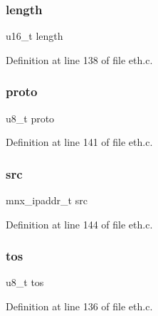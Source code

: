 \subsubsection{\texorpdfstring{length}{length}}
{\footnotesize\ttfamily u16\+\_\+t length}



Definition at line 138 of file eth.\+c.

\hypertarget{struct__ip__hdr_ade0fbcd035f91fd726e43fdb77bb7f5a}{}\label{struct__ip__hdr_ade0fbcd035f91fd726e43fdb77bb7f5a} 
\subsubsection{\texorpdfstring{proto}{proto}}
{\footnotesize\ttfamily u8\+\_\+t proto}



Definition at line 141 of file eth.\+c.

\hypertarget{struct__ip__hdr_a3c3920bc68ee63c63922a7bf2d5cc642}{}\label{struct__ip__hdr_a3c3920bc68ee63c63922a7bf2d5cc642} 
\subsubsection{\texorpdfstring{src}{src}}
{\footnotesize\ttfamily mnx\+\_\+ipaddr\+\_\+t src}



Definition at line 144 of file eth.\+c.

\hypertarget{struct__ip__hdr_aac7f784f9b144bfe1c2fe17898c3f839}{}\label{struct__ip__hdr_aac7f784f9b144bfe1c2fe17898c3f839} 
\subsubsection{\texorpdfstring{tos}{tos}}
{\footnotesize\ttfamily u8\+\_\+t tos}



Definition at line 136 of file eth.\+c.

\hypertarget{struct__ip__hdr_ac6f8d868fe85ab4e02b70759728ee1f9}{}\label{struct__ip__hdr_ac6f8d868fe85ab4e02b70759728ee1f9} 
